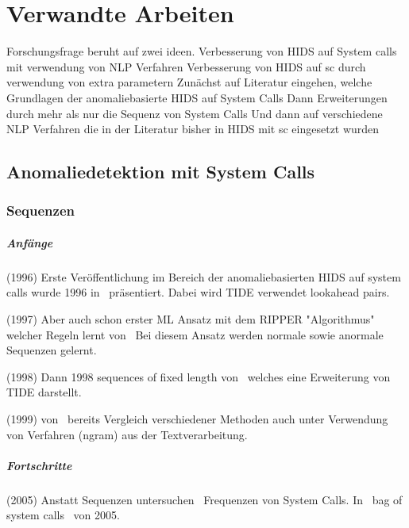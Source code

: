 \chapter{Verwandte Arbeiten}\label{ch:verwandte_arbeiten}

Forschungsfrage beruht auf zwei ideen.
Verbesserung von HIDS auf System calls mit verwendung von NLP Verfahren
Verbesserung von HIDS auf sc durch verwendung von extra parametern
Zunächst auf Literatur eingehen, welche Grundlagen der anomaliebasierte HIDS auf System Calls 
Dann Erweiterungen durch mehr als nur die Sequenz von System Calls
Und dann auf verschiedene NLP Verfahren die in der Literatur bisher in HIDS mit sc eingesetzt wurden

\section{Anomaliedetektion mit System Calls}

    \subsection{Sequenzen}

        \paragraph{Anfänge}
            (1996) Erste Veröffentlichung im Bereich der anomaliebasierten HIDS auf system calls wurde 1996 in~\cite{FORREST} präsentiert.
            Dabei wird TIDE verwendet lookahead pairs.

            (1997) Aber auch schon erster \ac{ML} Ansatz mit dem RIPPER "Algorithmus" welcher Regeln lernt von~\cite{LEE1997}
            Bei diesem Ansatz werden normale sowie anormale Sequenzen gelernt.

            (1998) Dann 1998 sequences of fixed length von~\cite{STIDE} welches eine Erweiterung von TIDE darstellt.

            (1999) von~\cite{STIDE_Alternatives} bereits Vergleich verschiedener Methoden auch unter Verwendung von Verfahren (ngram) aus der Textverarbeitung.


        \paragraph{Fortschritte}
            (2005) Anstatt Sequenzen untersuchen~\cite{FREQUENCY2} Frequenzen von System Calls.
            In~\cite{FREQUENCY2} \glqq bag of system calls \grqq\ von 2005.

